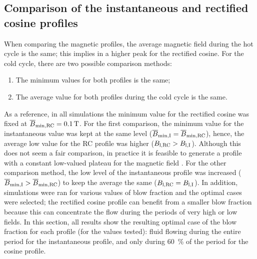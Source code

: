 \documentclass[draft]{svjour3}
\begin{document}
\subsection{Comparison of the instantaneous and rectified cosine profiles}
\label{sec:comp-inst-cosine}

When comparing the magnetic profiles, the average magnetic field during the hot cycle is the same; this implies in a higher peak for the rectified cosine. For the cold cycle, there are two possible comparison methods:

\begin{enumerate}
\item The minimum values for both profiles is the same;
\item The average value for both profiles during the cold cycle is the same.
\end{enumerate}

As a reference, in all simulations  the minimum value for the rectified cosine was fixed at $\overline{B}_{\mathrm{min,RC}} = \SI{0.1}{\tesla}$. For the first comparison, the minimum value for the instantaneous value was kept at the same level ($\overline{B}_{\mathrm{min,I}} =  \overline{B}_{\mathrm{min,RC}}$), hence, the average low value for the RC profile was higher ($B_{\mathrm{l,RC}} > B_{\mathrm{l,I}}$). Although this does not seem a fair comparison, in practice it is feasible to generate a profile with a constant low-valued plateau for the magnetic field \cite{bib:insinga16_optim,bib:benedict16_desig}. For the other comparison method, the low level of the instantaneous profile was increased ($\overline{B}_{\mathrm{min,I}} >  \overline{B}_{\mathrm{min,RC}}$) to keep the average the same ($B_{\mathrm{l,RC}} = B_{\mathrm{l,I}}$). In addition, simulations were ran for various values of blow fraction and the optimal cases were selected; the rectified cosine profile can benefit from a smaller blow fraction because this can concentrate the flow during the periods of very high or low fields. In this section, all results show the resulting optimal case of the blow fraction for each profile (for the values tested): fluid flowing during the entire period for the instantaneous profile, and only during \SI{60}{\percent} of the period for the cosine profile.
\end{document}
